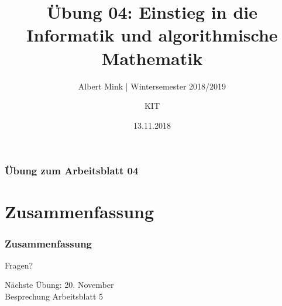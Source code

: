 \documentclass[c,18pt]{beamer}
\date{13.11.2018}
\title[Übung 04: Einstieg in die Informatik und algorithmische Mathematik]
  {Übung 04: Einstieg in die Informatik und algorithmische Mathematik}
\subtitle{Albert Mink | Wintersemester 2018/2019}
\author[Albert Mink, ]{KIT}
\institute[Institut für Angewandte und Numerische Mathematik (IANM)]{Institut für Angewandte und Numerische Mathematik}
\begin{document}
\begin{frame}
  \maketitle
\end{frame}

\begin{frame}
  \frametitle{Übung zum Arbeitsblatt 04}%
\tableofcontents
\end{frame}

\setcounter{exercise}{13}
\def\kap{1}
\setcounter{exercise}{14}
\setcounter{exercise}{15}

\section{Zusammenfassung}
\begin{frame}
  \frametitle{Zusammenfassung}%
\tableofcontents[hideallsubsections]
\end{frame}

\begin{frame}
\centering
\Huge\textcolor{KITgreen}{Fragen?}
\vspace{2cm}

{\LARGE
N\"achste \"Ubung: 20. November\\
Besprechung Arbeitsblatt 5
}
\end{frame}


\end{document}
